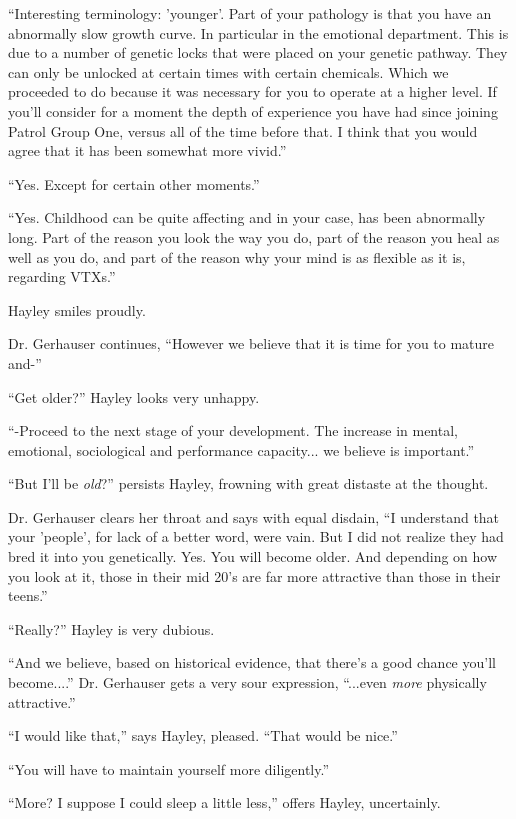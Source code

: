 ``Interesting terminology: 'younger'.  Part of your pathology is that you have an abnormally slow growth curve.   In particular in the emotional department.  This is due to a number of genetic locks that were placed on your genetic pathway.  They can only be unlocked at certain times with certain chemicals.  Which we proceeded to do because it was necessary for you to operate at a higher level.  If you'll consider for a moment the depth of experience you have had since joining Patrol Group One, versus all of the time before that.  I think that you would agree that it has been somewhat more vivid.''

``Yes. Except for certain other moments.''

``Yes.  Childhood can be quite affecting and in your case, has been abnormally long.  Part of the reason you look the way you do, part of the reason you heal as well as you do, and part of the reason why your mind is as flexible as it is, regarding VTXs.''

Hayley smiles proudly.

Dr. Gerhauser continues, ``However we believe that it is time for you to mature and-''

``Get older?'' Hayley looks very unhappy.

``-Proceed to the next stage of your development.  The increase in mental, emotional, sociological and performance capacity... we believe is important.''

``But I'll be \textit{old}?'' persists Hayley, frowning with great distaste at the thought.

Dr. Gerhauser clears her throat and says with equal disdain, ``I understand that your 'people', for lack of a better word, were vain.  But I did not realize they had bred it into you genetically.  Yes.  You will become older.  And depending on how you look at it, those in their mid 20's are far more attractive than those in their teens.''

``Really?'' Hayley is very dubious.

``And we believe, based on historical evidence, that there's a good chance you'll become....'' Dr. Gerhauser gets a very sour expression, ``...even \textit{more} physically attractive.''

``I would like that,'' says Hayley, pleased.  ``That would be nice.''

``You will have to maintain yourself more diligently.''

``More?  I suppose I could sleep a little less,'' offers Hayley, uncertainly.

